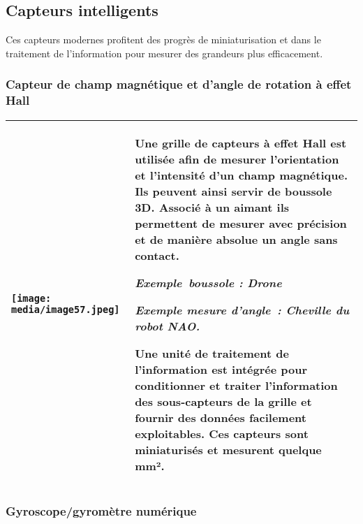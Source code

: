 \documentclass[
]{article}
\begin{document}
\hypertarget{capteurs-intelligents}{%
\subsection{Capteurs intelligents}\label{capteurs-intelligents}}

Ces capteurs modernes profitent des progrès de miniaturisation et dans
le traitement de l'information pour mesurer des grandeurs plus
efficacement.

\hypertarget{capteur-de-champ-magnuxe9tique-et-dangle-de-rotation-uxe0-effet-hall}{%
\subsubsection{Capteur de champ magnétique et d'angle de rotation à
effet
Hall}\label{capteur-de-champ-magnuxe9tique-et-dangle-de-rotation-uxe0-effet-hall}}

\begin{longtable}[]{@{}
  >{\raggedright\arraybackslash}p{}
  >{\raggedright\arraybackslash}p{}@{}}
\toprule
\endhead
\texttt{[image: media/image57.jpeg]} &
Une grille de capteurs à effet Hall est utilisée afin de mesurer
l'orientation et l'intensité d'un champ magnétique. Ils peuvent ainsi
servir de boussole 3D. Associé à un aimant ils permettent de mesurer
avec précision et de manière absolue un angle sans contact.

\emph{Exemple~boussole : Drone}

\emph{Exemple mesure d'angle~: Cheville du robot NAO.}

Une unité de traitement de l'information est intégrée pour conditionner
et traiter l'information des sous-capteurs de la grille et fournir des
données facilement exploitables. Ces capteurs sont miniaturisés et
mesurent quelque mm². \\
\bottomrule
\end{longtable}

\hypertarget{gyroscopegyromuxe8tre-numuxe9rique}{%
\subsubsection{Gyroscope/gyromètre
numérique}\label{gyroscopegyromuxe8tre-numuxe9rique}}
\end{document}
